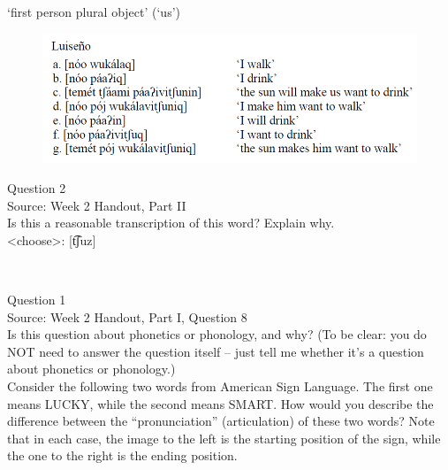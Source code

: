 \documentclass[12pt]{article}
\begin{document}
‘first person plural object’ (‘us’)

\begin{figure}[H]
\includegraphics{../images/luiseno.png}
\end{figure}

\newpage

{\large Question 2}\\

Source: Week 2 Handout, Part II\\

Is this a reasonable transcription of this word? Explain why.\\

<choose>: {[t͡ʃuz]}


\newpage

\begin{center}
\textbf{{\color{red}{\HUGE END OF EXAM}}}\\

\end{center}
\newpage

\begin{center}
\textbf{{\color{blue}{\HUGE START OF EXAM\\}}}

\textbf{{\color{blue}{\HUGE Student ID: 12991\\}}}

\textbf{{\color{blue}{\HUGE 9:50\\}}}

\end{center}
\newpage

{\large Question 1}\\

Source: Week 2 Handout, Part I, Question 8\\

Is this question about phonetics or phonology, and why? (To be clear: you do NOT need to answer the question itself -- just tell me whether it's a question about phonetics or phonology.)\\

Consider the following two words from American Sign Language. The first one means LUCKY, while the second means SMART. How would you describe the difference between the ``pronunciation'' (articulation) of these two words? Note that in each case, the image to the left is the starting position of the sign, while the one to the right is the ending position.
\end{document}
